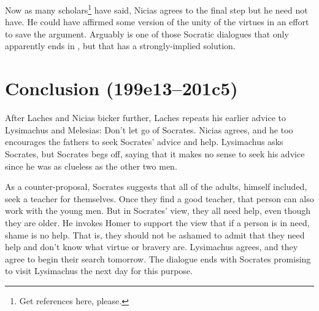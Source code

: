 \documentclass[11pt]{article}
\begin{document}
Now as many scholars\footnote{Get references here, please.} have said,
Nicias agrees to the final step but he need not have.  He could have
affirmed some version of the unity of the virtues in an effort to save the
argument.  Arguably  is one of those Socratic dialogues that
only apparently ends in , but that has a strongly-implied
solution.



\section{Conclusion (199e13--201c5)}

After Laches and Nicias bicker further, Laches repeats his earlier advice
to Lysimachus and Melesias: Don't let go of Socrates.  Nicias agrees, and
he too encourages the fathers to seek Socrates' advice and help.
Lysimachus asks Socrates, but Socrates begs off, saying that it makes no
sense to seek his advice since he was as clueless as the other two men.

As a counter-proposal, Socrates suggests that all of the adults, himself
included, seek a teacher for themselves.  Once they find a good teacher,
that person can also work with the young men.  But in Socrates' view, they
all need help, even though they are older.  He invokes Homer to support the
view that if a person is in need, shame is no help.  That is, they should
not be ashamed to admit that they need help and don't know what virtue or
bravery are.  Lysimachus agrees, and they agree to begin their search
tomorrow.  The dialogue ends with Socrates promising to visit Lysimachus
the next day for this purpose.



\newpage


\end{document}

